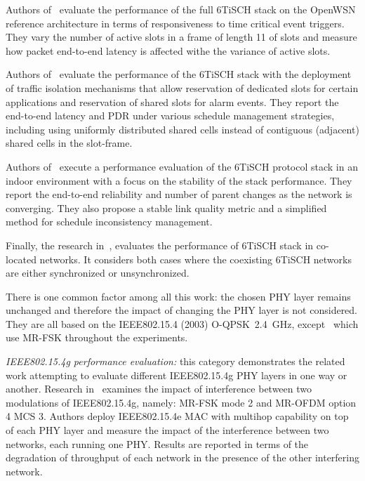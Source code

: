 \documentclass[sensors,article,submit,moreauthors,pdftex]{Definitions/mdpi}
\newcommand{\oqpsk}        {O-QPSK~2.4~GHz}
\begin{document}
Authors of~\cite{yang18analysis} evaluate the performance of the full 6TiSCH stack on the OpenWSN reference architecture in terms of responsiveness to time critical event triggers.
They vary the number of active slots in a frame of length 11 of slots and measure how packet end-to-end latency is affected withe the variance of active slots. 

Authors of~\cite{theoleyre16experimental} evaluate the performance of the 6TiSCH stack with the deployment of traffic isolation mechanisms that allow reservation of dedicated slots for certain applications and reservation of shared slots for alarm events.
They report the end-to-end latency and PDR under various schedule management strategies, including using uniformly distributed shared cells instead of contiguous (adjacent) shared cells in the slot-frame.

Authors of~\cite{teleshermeto18reactions} execute a performance evaluation of the 6TiSCH protocol stack in an indoor environment with a focus on the stability of the stack performance.
They report the end-to-end reliability and number of parent changes as the network is converging.
They also propose a stable link quality metric and a simplified method for schedule inconsistency management. 

Finally, the research in~\cite{benyaala16performance}, evaluates the performance of 6TiSCH stack in co-located networks.
It considers both cases where the coexisting 6TiSCH networks are either  synchronized or unsynchronized.

There is one common factor among all this work: the chosen PHY layer remains unchanged and therefore the impact of changing the PHY layer is not considered. 
They are all based on the IEEE802.15.4 (2003) \oqpsk , except~\cite{sum17experimental} which use MR-FSK throughout the experiments. 


\textit{IEEE802.15.4g performance evaluation:} this category  demonstrates the related  work attempting to evaluate different IEEE802.15.4g PHY layers in one way or another.
Research in~\cite{kojima15system} examines the impact of interference between two modulations of IEEE802.15.4g, namely: MR-FSK mode 2 and MR-OFDM option 4 MCS 3. 
Authors deploy IEEE802.15.4e MAC with multihop capability on top of each PHY layer and measure the impact of the interference between two networks, each running one PHY.
Results are reported in terms of the degradation of throughput of each network in the presence of the other interfering network.
\end{document}
